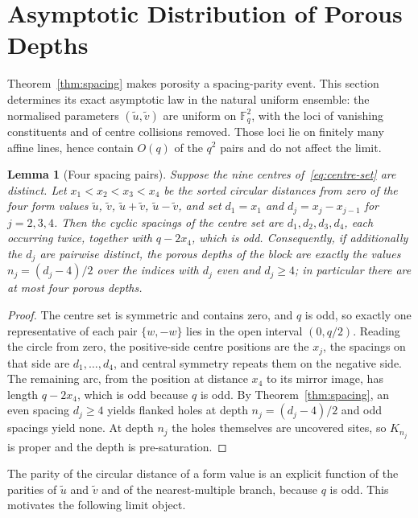 \documentclass[11pt,a4paper]{article}
\newtheorem{lemma}[theorem]{Lemma}
\theoremstyle{definition}
\theoremstyle{remark}
\newcommand{\Fq}{\mathbb{F}_q}
\begin{document}
\section{Asymptotic Distribution of Porous Depths}
\label{sec:porous-asymptotics}

Theorem~\ref{thm:spacing} makes porosity a spacing-parity event.
This section determines its exact asymptotic law in the natural uniform ensemble: the
normalised parameters $(\widetilde u,\widetilde v)$ are uniform on $\Fq^2$, with the loci of
vanishing constituents and of centre collisions removed.
Those loci lie on finitely many affine lines, hence contain $O(q)$ of the $q^2$ pairs and do
not affect the limit.

\begin{lemma}[Four spacing pairs]
  \label{lem:four-spacings}
  Suppose the nine centres of~\eqref{eq:centre-set} are distinct.
  Let $x_1<x_2<x_3<x_4$ be the sorted circular distances from zero of the four form values
  $\widetilde u$, $\widetilde v$, $\widetilde u+\widetilde v$, $\widetilde u-\widetilde v$,
  and set $d_1=x_1$ and $d_j=x_j-x_{j-1}$ for $j=2,3,4$.
  Then the cyclic spacings of the centre set are $d_1,d_2,d_3,d_4$, each occurring twice,
  together with $q-2x_4$, which is odd.
  Consequently, if additionally the $d_j$ are pairwise distinct, the porous depths of the
  block are exactly the values $n_j=(d_j-4)/2$ over the indices with $d_j$ even and
  $d_j\geq4$; in particular there are at most four porous depths.
\end{lemma}

\begin{proof}
  The centre set is symmetric and contains zero, and $q$ is odd, so exactly one
  representative of each pair $\{w,-w\}$ lies in the open interval $(0,q/2)$.
  Reading the circle from zero, the positive-side centre positions are the $x_j$, the
  spacings on that side are $d_1,\ldots,d_4$, and central symmetry repeats them on the
  negative side.
  The remaining arc, from the position at distance $x_4$ to its mirror image, has length
  $q-2x_4$, which is odd because $q$ is odd.
  By Theorem~\ref{thm:spacing}, an even spacing $d_j\geq4$ yields flanked holes at depth
  $n_j=(d_j-4)/2$ and odd spacings yield none.
  At depth $n_j$ the holes themselves are uncovered sites, so $K_{n_j}$ is proper and the
  depth is pre-saturation.
\end{proof}

The parity of the circular distance of a form value is an explicit function of the parities
of $\widetilde u$ and $\widetilde v$ and of the nearest-multiple branch, because $q$ is odd.
This motivates the following limit object.
\end{document}
